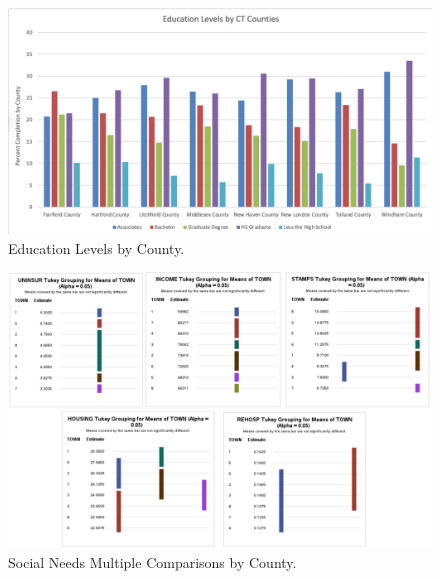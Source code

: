 \documentclass[12pt]{article}
\begin{document}
\begin{figure}[tbp]
  \label{fig:Education by County Graph}
    \centering
    \includegraphics[width=\textwidth]{Education Levels by County.pdf}
    \caption{Education Levels by County.}
  \end{figure}


\begin{figure}[tbp]
  \label{fig:Income by County Graph}
    \centering
    \includegraphics[width=\textwidth]{Multiple Comparisons by County.pdf}
    \caption{Social Needs Multiple Comparisons by County.}
  \end{figure}
\end{document}
